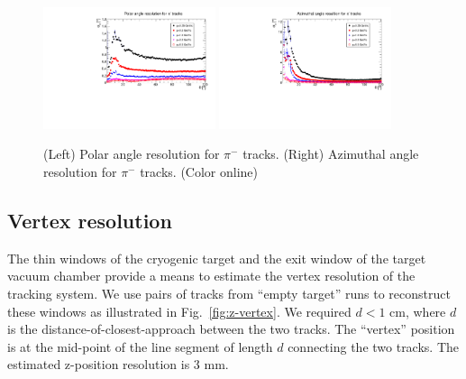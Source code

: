 \begin{figure}[tbp]
\begin{center}
\includegraphics[width=0.45\textwidth]{figures/PionThetaResolution.pdf}
\includegraphics[width=0.45\textwidth]{figures/PionPhiResolution.pdf}
\caption{\label{fig:angle res} (Left) Polar angle resolution for $\pi^-$ tracks.
(Right) Azimuthal angle resolution for $\pi^-$ tracks.
 (Color online)}
\end{center}
\end{figure}


\subsection{Vertex resolution}

The thin windows of the cryogenic target and the exit window of the target
vacuum chamber provide a means to estimate the 
vertex resolution of the tracking system.  We use pairs of tracks from 
``empty target'' runs to reconstruct these windows as illustrated in 
Fig.~\ref{fig:z-vertex}.  We required $d<1$ cm, where $d$ is the 
distance-of-closest-approach between the two tracks. The ``vertex'' position 
is at the mid-point of the line segment of length $d$ connecting the two tracks.
The estimated z-position resolution is 3 mm.

